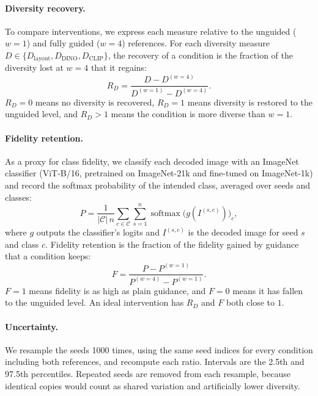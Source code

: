 \documentclass[sigconf,nonacm]{acmart}
\begin{document}
\paragraph{Diversity recovery.}
To compare interventions, we express each measure relative to the unguided ($w=1$) and fully guided ($w=4$) references. For each diversity measure $D \in \{D_{\text{layout}}, D_{\text{DINO}}, D_{\text{CLIP}}\}$, the recovery of a condition is the fraction of the diversity lost at $w=4$ that it regains:
\begin{equation}
  R_D = \frac{D - D^{(w=4)}}{D^{(w=1)} - D^{(w=4)}} .
  \label{eq:recovery}
\end{equation}
$R_D = 0$ means no diversity is recovered, $R_D = 1$ means diversity is restored to the unguided level, and $R_D > 1$ means the condition is more diverse than $w=1$.

\paragraph{Fidelity retention.}
As a proxy for class fidelity, we classify each decoded image with an ImageNet classifier (ViT-B/16, pretrained on ImageNet-21k and fine-tuned on ImageNet-1k) and record the softmax probability of the intended class, averaged over seeds and classes:
\begin{equation}
  P = \frac{1}{|\mathcal{C}|\, n} \sum_{c \in \mathcal{C}} \sum_{s=1}^{n}
  \operatorname{softmax}\big(g(I^{(s,c)})\big)_c ,
  \label{eq:fidelity}
\end{equation}
where $g$ outputs the classifier's logits and $I^{(s,c)}$ is the decoded image for seed $s$ and class $c$. Fidelity retention is the fraction of the fidelity gained by guidance that a condition keeps:
\begin{equation}
  F = \frac{P - P^{(w=1)}}{P^{(w=4)} - P^{(w=1)}} .
  \label{eq:retention}
\end{equation}
$F = 1$ means fidelity is as high as plain guidance, and $F = 0$ means it has fallen to the unguided level. An ideal intervention has $R_D$ and $F$ both close to $1$.

\paragraph{Uncertainty.}
We resample the seeds 1000 times, using the same seed indices for every condition including both references, and recompute each ratio. Intervals are the 2.5th and 97.5th percentiles. Repeated seeds are removed from each resample, because identical copies would count as shared variation and artificially lower diversity.
\end{document}
